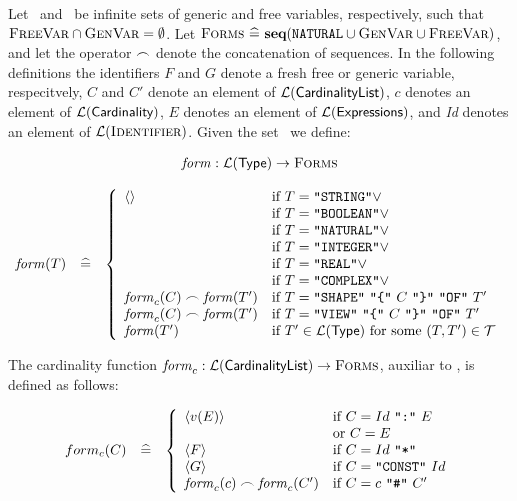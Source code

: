 Let \genvar\ and \freevar\ be infinite sets of generic and free
variables, respectively, such that $\mbox{\sc FreeVar} \cap \mbox{\sc GenVar} =
\emptyset$. Let $\mbox{\sc Forms\/} ~ \widehat{=} ~ \mbox{\bf seq}(\mbox{\tt
NATURAL} \cup \mbox{\sc GenVar} \cup \mbox{\sc FreeVar})$, and let the operator $\frown$
denote the concatenation of sequences. In the following definitions
the identifiers $F$ and $G$ denote a fresh free or generic variable,
respecitvely, $C$ and $C'$ denote an element of
$\mbox{$\cal L$}(\mbox{\sf {CardinalityList}})$, $c$ denotes an element of
$\mbox{$\cal L$}(\mbox{\sf {Cardinality}})$, $E$ denotes an element of
$\mbox{$\cal L$}(\mbox{\sf {Expressions}})$, and {\em Id} denotes an element of
$\mbox{$\cal L$}(\mbox{\sc {Identifier}})$. Given the set \TypeDefSet\ we define:

\[
\begin{array}{rcl}
\multicolumn{3}{c}{
\form: \Language{\NT{Type}} \rightarrow \Forms}\\
\hlf
\form(T) & \widehat{=} &
\left\{\begin{array}{ll}
\langle \rangle	
        & \mbox{if } T = \T{STRING} \vee\\
	& \mbox{if } T = \T{BOOLEAN} \vee\\
	& \mbox{if } T = \T{NATURAL} \vee\\
	& \mbox{if } T = \T{INTEGER} \vee\\
	& \mbox{if } T = \T{REAL} \vee\\
	& \mbox{if } T = \T{COMPLEX} \vee\\
\form_c(C)\concat\form(T')
	& \mbox{if } T = \T{SHAPE}\ \T{\{}\ C\ \T{\}}\ \T{OF}\ T' \\
\form_c(C)\concat\form(T')
	& \mbox{if } T = \T{VIEW}\ \T{\{}\ C\ \T{\}}\ \T{OF}\ T' \\
\form(T')
        & \mbox{if } T' \in \Language{\NT{Type}}\ \mbox{for some } (T,
	T') \in \TypeDefSet \\
\end{array}
\right.\\
\end{array}
\]

\noindent
The cardinality function $\mbox{\em form\/}_{c}: \mbox{$\cal L$}(\mbox{\sf {CardinalityList}}) 
\rightarrow \mbox{\sc Forms\/}$, auxiliar to \form, is defined as follows:

\[
\begin{array}{rcl}
form_{c}(C) & \widehat{=} & \left\{
\begin{array}{ll}
\langle v(E)\rangle
	& \mbox{if } C = Id\ \mbox{\tt "{:}"}\ E \\
	& \mbox{or } C = E \\
\langle F \rangle
	& \mbox{if } C = Id\ \mbox{\tt "{*}"}\\
\langle G \rangle
	& \mbox{if } C = \mbox{\tt "{CONST}"}\ Id \\
\mbox{\em form\/}_c(c)\frown\mbox{\em form\/}_c(C')
	& \mbox{if } C = c\ \mbox{\tt "{\#}"}\ C' \\
\end{array}
\right.\\
\end{array}
\]


